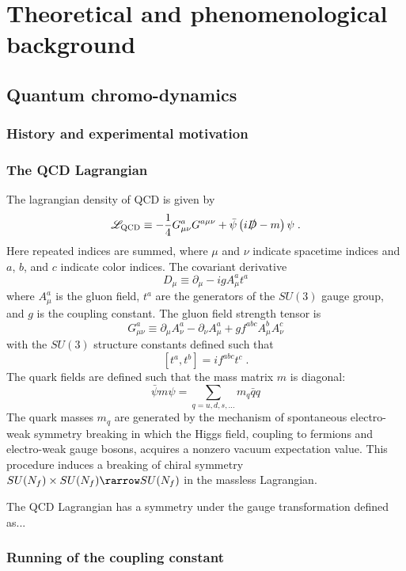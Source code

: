 \chapter{Theoretical and phenomenological background}
\label{ch:background}

\section{Quantum chromo-dynamics}
\subsection{History and experimental motivation}
\subsection{The QCD Lagrangian}
The lagrangian density of QCD is given by
\begin{equation}
  \mathscr{L}_\mathrm{QCD} \equiv -\frac{1}{4} G^a_{\mu\nu}G^{a\mu\nu} + \bar{\psi} \left( i \slashed{D} - m \right) \psi \; .
\end{equation}
Here repeated indices are summed, where $\mu$ and $\nu$ indicate spacetime indices and $a$, $b$, and $c$ indicate color indices.
The covariant derivative
\[ D_\mu \equiv \partial_\mu - i g A^a_\mu t^a\]
where $A^a_\mu$ is the gluon field, $t^a$ are the generators of the $SU(3)$ gauge group, and $g$ is the coupling constant.
The gluon field strength tensor is
\[ G^a_{\mu\nu} \equiv \partial_\mu A^a_\nu - \partial_\nu A^a_\mu + g f^{abc} A^b_\mu A^c_\nu \]
with the $SU(3)$ structure constants defined such that
\[ [t^a,t^b] = if^{abc}t^c \; .\]
The quark fields are defined such that the mass matrix $m$ is diagonal:
\[ \bar{\psi}m\psi = \sum_{q = u,d,s,\ldots} m_{q}\bar{q}q \]
The quark masses $m_q$ are generated by the mechanism of spontaneous electro-weak symmetry breaking in which the Higgs field, coupling to fermions and electro-weak gauge bosons, acquires a nonzero vacuum expectation value.
This procedure induces a breaking of chiral symmetry $SU(N_f) \times SU(N_f) \rarrow SU(N_f)$ in the massless Lagrangian. %

The QCD Lagrangian has a symmetry under the gauge transformation defined as...

\subsection{Running of the coupling constant} %
